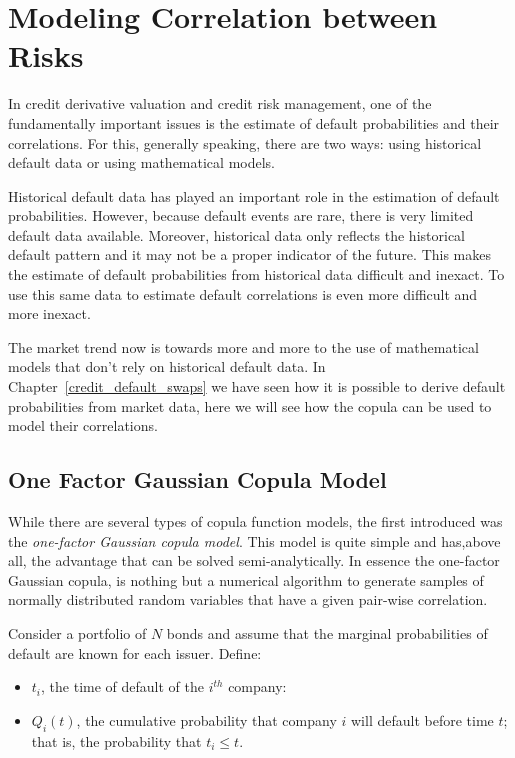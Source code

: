 \chapter{Modeling Correlation between Risks}

In credit derivative valuation and credit risk management, one of the
fundamentally important issues is the estimate of default
probabilities and their correlations. For this, generally speaking,
there are two ways: using historical default data or using mathematical
models.

Historical default data has played an important role in the estimation
of default probabilities. However, because default events are rare,
there is very limited default data available. Moreover, historical data only
reflects the historical default pattern and it may not be a proper
indicator of the future. This makes the estimate of default
probabilities from historical data difficult and inexact. To use this
same data to estimate default correlations is even more difficult and
more inexact.

The market trend now is towards more and more to the use of mathematical
models that don't rely on historical default data. In
Chapter~\ref{credit_default_swaps} we have seen how it is possible to derive default probabilities from market data,
here we will see how the copula can be used to model their correlations. 

\section{One Factor Gaussian Copula Model}\label{standard-market-model}
While there are several types of copula function models, the first
introduced was the \emph{one-factor Gaussian copula model}. This model 
is quite simple and has,above all, the advantage that can be solved semi-analytically.
In essence the one-factor Gaussian copula, is nothing but a numerical algorithm to generate samples of normally distributed random variables that have a given
pair-wise correlation. 

Consider a portfolio of \(N\) bonds and assume that the marginal
probabilities of default are known for each issuer. Define:

\begin{itemize}
	\tightlist
	\item
	\(t_i\), the time of default of the \(i^{th}\) company:
	\item
	\(Q_i(t)\), the cumulative probability that company \(i\) will default
	before time \(t\); that is, the probability that \(t_i \le t\).
\end{itemize}

